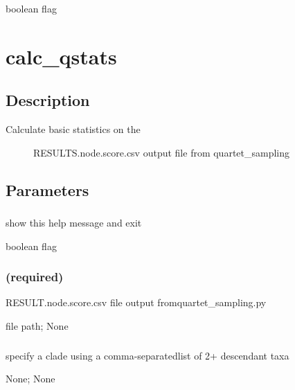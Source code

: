 \documentclass[letterpaper,12pt,english]{sphinxmanual}
\begin{document}
 boolean flag


\section{calc\_qstats}
\label{\detokenize{prog_desc:calc-qstats}}

\subsection{Description}
\label{\detokenize{prog_desc:id14}}\begin{description}
\item[{Calculate basic statistics on the}] \leavevmode
RESULTS.node.score.csv output file
from quartet\_sampling

\end{description}


\subsection{Parameters}
\label{\detokenize{prog_desc:id15}}

\subsubsection{}
\label{\detokenize{prog_desc:id16}}
 show this help message and exit

 boolean flag


\subsubsection{ (required)}
\label{\detokenize{prog_desc:d-data-required}}
 RESULT.node.score.csv file output fromquartet\_sampling.py

 file path;  None


\subsubsection{}
\label{\detokenize{prog_desc:id17}}
 specify a clade using a comma-separatedlist of 2+ descendant taxa

 None;  None
\end{document}

